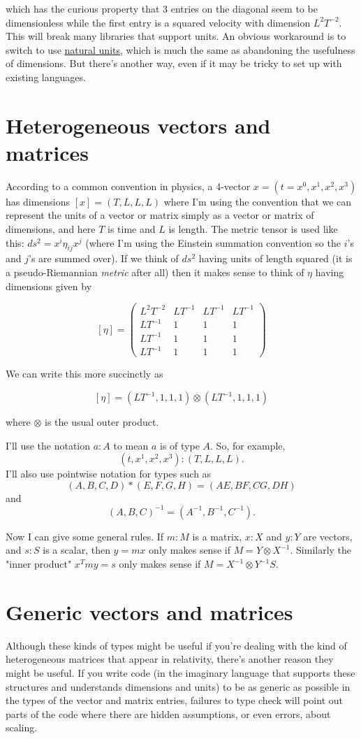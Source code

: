 \documentclass[12pt]{article}
\begin{document}
which has the curious property that 3 entries on the diagonal seem to be dimensionless while the first entry is a squared velocity with dimension $L^2T^{-2}$.
This will break many libraries that support units.
An obvious workaround is to switch to use \href{https://en.wikipedia.org/wiki/Natural_units}{natural units}, which is much the same as abandoning the usefulness of dimensions.
But there's another way, even if it may be tricky to set up with existing languages.

\section{Heterogeneous vectors and matrices}
According to a common convention in physics, a 4-vector $x=(t=x^0,x^1,x^2,x^3)$ has dimensions $[x]=(T, L, L, L)$ where I'm using the convention that we can represent the units of a vector or matrix simply as a vector or matrix of dimensions, and here $T$ is time and $L$ is length.
The metric tensor is used like this: $ds^2=x^i\eta_{ij}x^j$ (where I'm using the Einstein summation convention so the $i$'s and $j$'s are summed over).
If we think of $ds^2$ having units of length squared (it is a pseudo-Riemannian {\it metric} after all) then it makes sense to think of $\eta$ having dimensions given by

$$[\eta]=\begin{pmatrix}L^2T^{-2}&LT^{-1}&LT^{-1}&LT^{-1}\\LT^{-1}&1&1&1\\LT^{-1}&1&1&1\\LT^{-1}&1&1&1\end{pmatrix}$$

We can write this more succinctly as

$$[\eta]=(LT^{-1},1,1,1)\otimes(LT^{-1},1,1,1)$$

where $\otimes$ is the usual outer product.

I'll use the notation $a:A$ to mean $a$ is of type $A$. So, for example, $$(t,x^1,x^2,x^3):(T,L,L,L).$$ I'll also use pointwise notation for types such as $$(A,B,C,D)*(E,F,G,H)=(AE,BF,CG,DH)$$ and $$(A,B,C)^{-1}=(A^{-1},B^{-1},C^{-1}).$$

Now I can give some general rules. If $m:M$ is a matrix, $x:X$ and $y:Y$ are vectors, and $s:S$ is a scalar, then $y=mx$ only makes sense if $M=Y\otimes X^{-1}$.
Similarly the "inner product" $x^Tmy=s$ only makes sense if $M=X^{-1}\otimes Y^{-1}S$.

\section{Generic vectors and matrices}
Although these kinds of types might be useful if you're dealing with the kind of heterogeneous matrices that appear in relativity, there's another reason they might be useful.
If you write code (in the imaginary language that supports these structures and understands dimensions and units) to be as generic as possible in the types of the vector and matrix entries, failures to type check will point out parts of the code where there are hidden assumptions, or even errors, about scaling.
\end{document}
